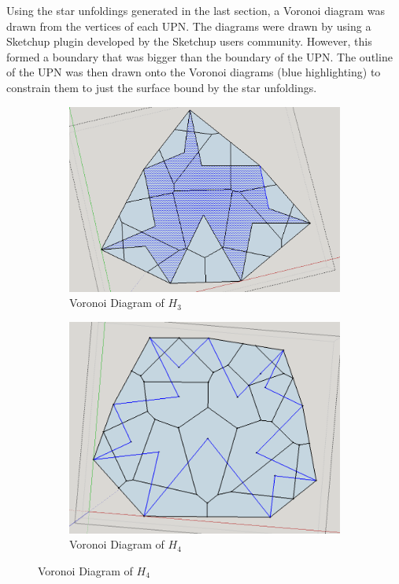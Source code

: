 \documentclass[12 pt]{article}
\begin{document}
	Using the star unfoldings generated in the last section, a Voronoi diagram was drawn from the vertices of each UPN. The diagrams were drawn by using a Sketchup plugin developed by the Sketchup users community. However, this formed a boundary that was bigger than the boundary of the UPN. The outline of the UPN was then drawn onto the Voronoi diagrams (blue highlighting) to constrain them to just the surface bound by the star unfoldings. 
\begin{figure}[h]
\centering
	\begin{subfigure}[t]{0.4\textwidth}
	\caption{Voronoi Diagram of $H_3$}
	\includegraphics[scale=0.17]{vDiags/h3Voronoi.png}
	\end{subfigure}
	\begin{subfigure}[t]{0.4\textwidth}
	\includegraphics[scale=0.17]{vDiags/h4Voronoi}
	\caption{Voronoi Diagram of $H_4$}
	\end{subfigure}
\end{figure}	
\end{document}
